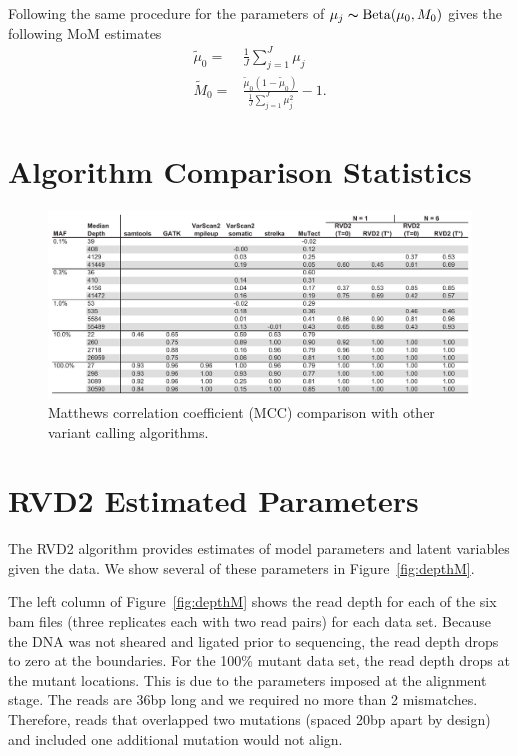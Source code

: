 \documentclass[11pt,reqno]{amsart}
\begin{document}
Following the same procedure for the parameters of $\mu_j \thicksim \text{Beta}(\mu_0, M_0)$ gives the following MoM estimates
\begin{eqnarray}
	\tilde{\mu}_0 =& \frac{1}{J} \sum_{j=1}^J \mu_j \\
	\tilde{M}_0 =& \frac{ \tilde{\mu}_0 (1 - \tilde{\mu}_0 ) } {\frac{1}{J} \sum_{j=1}^J \mu_j^2 } -1.
\end{eqnarray}

\section{Algorithm Comparison Statistics}\label{sec:app_comparison}

\begin{figure}[h]
\begin{center}
\includegraphics[width=140mm]{pdf_figs/comparison_table_mcc.pdf}
\caption{Matthews correlation coefficient (MCC) comparison with other variant calling algorithms.}
\label{fig:comparison_mcc}
\end{center}
\end{figure}



\section{RVD2 Estimated Parameters}\label{sec:synthetic_estimate}
The RVD2 algorithm provides estimates of model parameters and latent variables given the data. We show several of these parameters in Figure~\ref{fig:depthM}. 

The left column of Figure~\ref{fig:depthM} shows the read depth for each of the six bam files (three replicates each with two read pairs) for each data set. Because the DNA was not sheared and ligated prior to sequencing, the read depth drops to zero at the boundaries. For the 100\% mutant data set, the read depth drops at the mutant locations. This is due to the parameters imposed at the alignment stage. The reads are 36bp long and we required no more than 2 mismatches. Therefore, reads that overlapped two mutations (spaced 20bp apart by design) and included one additional mutation would not align.
\end{document}
